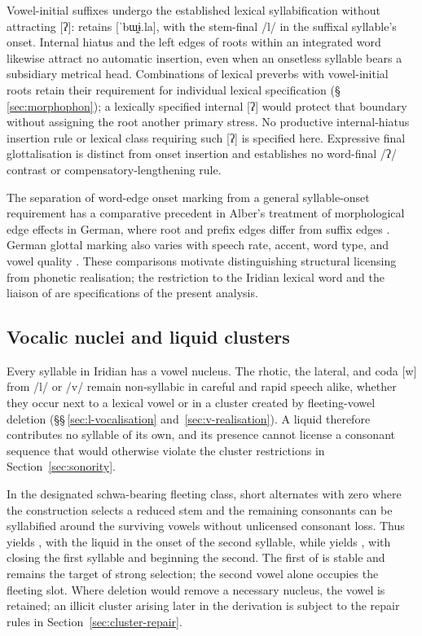Vowel-initial suffixes undergo the established lexical syllabification
without attracting [ʔ]:  retains [ˈbɯ̯ɨ.la], with the stem-final
/l/ in the suffixal syllable's onset. Internal hiatus and the left edges of
roots within an integrated word likewise attract no automatic insertion,
even when an onsetless syllable bears a subsidiary metrical head.
Combinations of lexical preverbs with vowel-initial roots retain their
requirement for individual lexical specification
(§\,\ref{sec:morphophon}); a lexically specified internal [ʔ] would
protect that boundary without assigning the root another primary stress.
No productive internal-hiatus insertion rule or lexical class requiring
such [ʔ] is specified here. Expressive final glottalisation is distinct
from onset insertion and establishes no word-final /ʔ/ contrast or
compensatory-lengthening rule.

The separation of word-edge onset marking from a general syllable-onset
requirement has a comparative precedent in Alber's treatment of
morphological edge effects in German, where root and prefix edges differ
from suffix edges \cite[p.~10]{alber2001}. German glottal marking also
varies with speech rate, accent, word type, and vowel quality
\cite[pp.~14--15]{pompinozygis2010}. These comparisons motivate distinguishing
structural licensing from phonetic realisation; the restriction to the
Iridian lexical word and the liaison of  are specifications of
the present analysis.

\subsection{Vocalic nuclei and liquid clusters}\label{sec:vocalic-nuclei}

Every syllable in Iridian has a vowel nucleus. The rhotic, the lateral, and
coda [w] from /l/ or /v/ remain non-syllabic in careful and rapid speech
alike, whether they occur next to a lexical vowel or in a cluster created by
fleeting-vowel deletion (§§\,\ref{sec:l-vocalisation}
and~\ref{sec:v-realisation}). A liquid
therefore contributes no syllable of its own, and its presence cannot license
a consonant sequence that would otherwise violate the cluster restrictions
in Section~\ref{sec:sonority}.

In the designated schwa-bearing fleeting class, short  alternates
with zero where the construction selects a reduced stem and the
remaining consonants can be syllabified around the surviving vowels without
unlicensed consonant loss. Thus  yields , with the
liquid in the onset of the second syllable, while  yields
, with  closing the first syllable and  beginning
the second. The first  of  is stable and remains the
target of strong selection; the second vowel alone occupies the fleeting
slot. Where deletion would remove
a necessary nucleus, the vowel is retained; an illicit cluster arising later
in the derivation is subject to the repair rules in
Section~\ref{sec:cluster-repair}.

